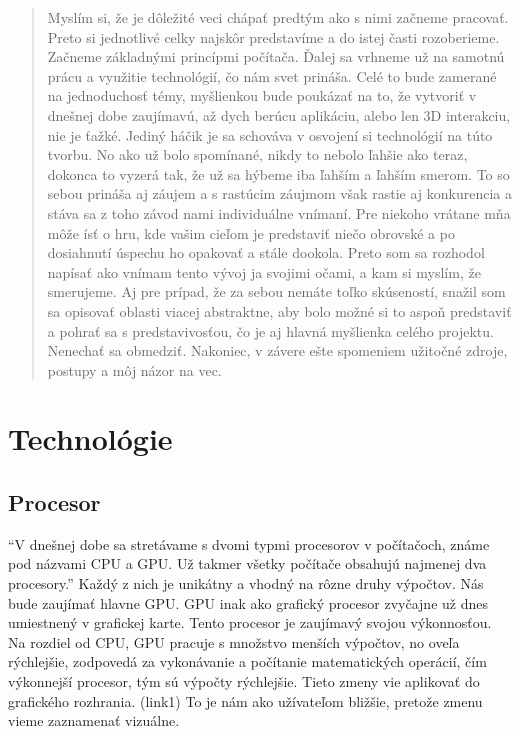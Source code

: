 \documentclass[10pt,oneside,slovak,a4paper]{article}
\begin{document}
\begin{abstract}

	Myslím si, že je dôležité veci chápať predtým ako s nimi začneme pracovať. Preto si jednotlivé celky najskôr predstavíme a do istej časti rozoberieme.
	Začneme základnými princípmi počítača. Ďalej sa vrhneme už na samotnú prácu a využitie technológií, čo nám svet prináša.
	Celé to bude zamerané na jednoduchosť témy, myšlienkou bude poukázať na to, že vytvoriť v dnešnej dobe zaujímavú, až dych berúcu aplikáciu, alebo len 3D interakciu, nie je ťažké.
	Jediný háčik je sa schováva v osvojení si technológií na túto tvorbu.
	No ako už bolo spomínané, nikdy to nebolo ľahšie ako teraz, dokonca to vyzerá tak, že už sa hýbeme iba ľahším a ľahším smerom.
	To so sebou prináša aj záujem a s rastúcim záujmom však rastie aj konkurencia a stáva sa z toho závod nami individuálne vnímaní.
	Pre niekoho vrátane mňa môže ísť o hru, kde vašim cieľom je predstaviť niečo obrovské a po dosiahnutí úspechu ho opakovať a stále dookola.
	Preto som sa rozhodol napísať ako vnímam tento vývoj ja svojimi očami, a kam si myslím, že smerujeme.
	Aj pre prípad, že za sebou nemáte toľko skúseností, snažil som sa opisovať oblasti viacej abstraktne, aby bolo možné si to aspoň predstaviť a pohrať sa s predstavivosťou, čo je aj hlavná myšlienka celého projektu.
	Nenechať sa obmedziť. Nakoniec, v závere ešte spomeniem užitočné zdroje, postupy a môj názor na vec.

\end{abstract}

\section{Technológie}

\subsection{Procesor}

“V dnešnej dobe sa stretávame s dvomi typmi procesorov v počítačoch, známe pod názvami CPU a GPU. Už takmer všetky počítače obsahujú najmenej dva procesory.” \cite{Graphics-programming}
Každý z nich je unikátny a vhodný na rôzne druhy výpočtov. Nás bude zaujímať hlavne GPU. GPU inak ako grafický procesor zvyčajne už dnes umiestnený v grafickej karte.
Tento procesor je zaujímavý svojou výkonnosťou.
Na rozdiel od CPU, GPU pracuje s množstvo menších výpočtov, no oveľa rýchlejšie, zodpovedá za vykonávanie a počítanie matematických operácií, čím výkonnejší procesor, tým sú výpočty rýchlejšie.
Tieto zmeny vie aplikovať do grafického rozhrania. (link1) To je nám ako užívateľom bližšie, pretože zmenu vieme zaznamenať vizuálne.
\end{document}
